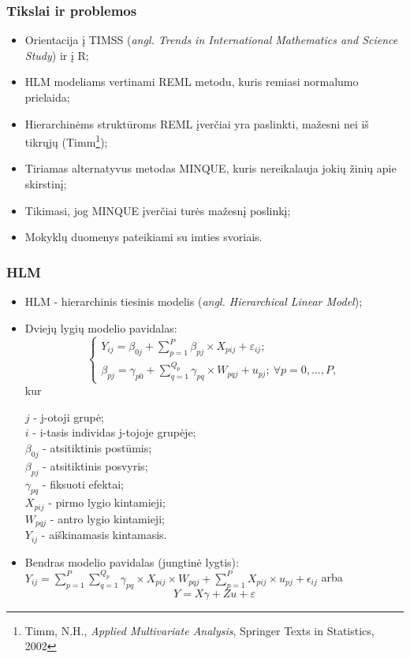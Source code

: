 \documentclass[utf8,hyperref={unicode,pdftex}]{beamer}
\begin{document}
\begin{frame}
\frametitle{Tikslai ir problemos}
\begin{itemize}
\item Orientacija į TIMSS (\textit{angl. Trends in International Mathematics and Science Study}) ir į R;
\item HLM modeliams vertinami REML metodu, kuris remiasi normalumo prielaida;
\item Hierarchinėms struktūroms REML įverčiai yra paslinkti, mažesni nei iš tikrųjų (Timm\footnote{Timm, N.H., \textit{Applied Multivariate Analysis}, Springer Texts in Statistics, 2002});
\item Tiriamas alternatyvus metodas MINQUE, kuris nereikalauja jokių žinių apie skirstinį;
\item Tikimasi, jog MINQUE įverčiai turės mažesnį poslinkį;
\item Mokyklų duomenys pateikiami su imties svoriais.
\end{itemize}
\end{frame}
\begin{frame}
\frametitle{HLM}
\begin{itemize}
\item HLM - hierarchinis tiesinis modelis (\textit{angl. Hierarchical Linear Model});
\item Dviejų lygių modelio pavidalas: 
\[ \left\{
  \begin{array}{l}
    Y_{ij} = \beta_{0j}+\sum^P_{p = 1} \beta_{pj}\times X_{pij}+\varepsilon_{ij}; \\
    \beta_{pj} = \gamma_{p0} + \sum^{Q_p}_{q=1}\gamma_{pq}\times W_{pqj}+u_{pj};\ \forall p = 0 , \dots, P,
  \end{array} \right.\]
kur\\
\begin{scriptsize}
$j$ - j-otoji grupė;\\
$i$ - i-tasis individas j-tojoje grupėje;\\
$\beta_{0j}$ - atsitiktinis postūmis;\\
$\beta_{pj}$ - atsitiktinis posvyris;\\
$\gamma_{pq}$ - fiksuoti efektai;\\
$X_{pij}$ - pirmo lygio kintamieji;\\
$W_{pqj}$ - antro lygio kintamieji;\\
$Y_{ij}$ - aiškinamasis kintamasis.
\end{scriptsize}
\small
\item Bendras modelio pavidalas (jungtinė lygtis): $ Y_{ij} =\sum^P_{p = 1} \sum^{Q_p}_{q=1}\gamma_{pq}\times X_{pij}\times W_{pqj}+\sum^P_{p = 1} X_{pij}\times u_{pj}+\epsilon_{ij}$ arba
\begin{equation*}
Y=X\gamma+Zu+\varepsilon
\end{equation*}
\end{itemize}
\end{frame}
\end{document}
